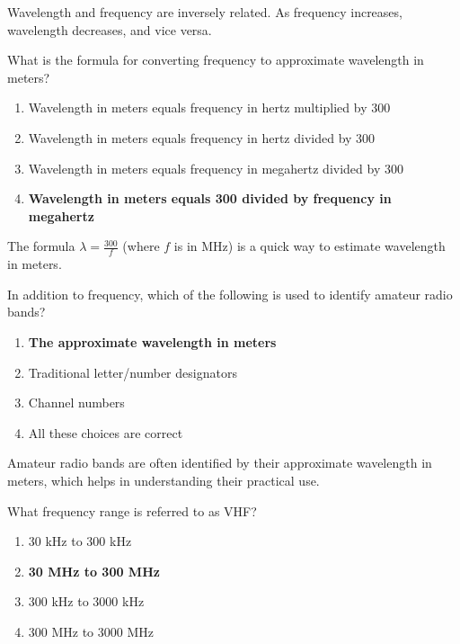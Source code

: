 Wavelength and frequency are inversely related. As frequency increases, wavelength decreases, and vice versa.

\begin{tcolorbox}[colback=gray!10!white,colframe=black!75!black,title={T3B06}]
What is the formula for converting frequency to approximate wavelength in meters?
\begin{enumerate}[label=\Alph*),noitemsep]
    \item Wavelength in meters equals frequency in hertz multiplied by 300
    \item Wavelength in meters equals frequency in hertz divided by 300
    \item Wavelength in meters equals frequency in megahertz divided by 300
    \item \textbf{Wavelength in meters equals 300 divided by frequency in megahertz}
\end{enumerate}
\end{tcolorbox}

The formula \(\lambda = \frac{300}{f}\) (where \(f\) is in MHz) is a quick way to estimate wavelength in meters.

\begin{tcolorbox}[colback=gray!10!white,colframe=black!75!black,title={T3B07}]
In addition to frequency, which of the following is used to identify amateur radio bands?
\begin{enumerate}[label=\Alph*),noitemsep]
    \item \textbf{The approximate wavelength in meters}
    \item Traditional letter/number designators
    \item Channel numbers
    \item All these choices are correct
\end{enumerate}
\end{tcolorbox}

Amateur radio bands are often identified by their approximate wavelength in meters, which helps in understanding their practical use.

\begin{tcolorbox}[colback=gray!10!white,colframe=black!75!black,title={T3B08}]
What frequency range is referred to as VHF?
\begin{enumerate}[label=\Alph*),noitemsep]
    \item 30 kHz to 300 kHz
    \item \textbf{30 MHz to 300 MHz}
    \item 300 kHz to 3000 kHz
    \item 300 MHz to 3000 MHz
\end{enumerate}
\end{tcolorbox}

